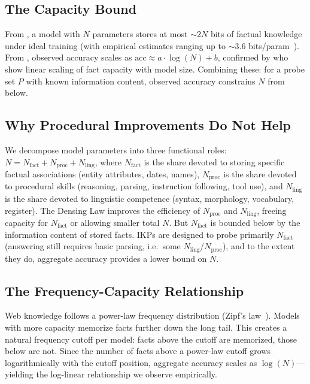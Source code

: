\documentclass[11pt]{article}
\begin{document}
\subsection{The Capacity Bound}

From \citet{allenzhu2025}, a model with $N$ parameters stores at most ${\sim}2N$ bits of factual knowledge under ideal training (with empirical estimates ranging up to ${\sim}3.6$ bits/param~\citep{morris2025memorize}). From \citet{kandpal2023}, observed accuracy scales as $\text{acc} \approx a \cdot \log(N) + b$, confirmed by \citet{lu2024factmemorization} who show linear scaling of fact capacity with model size. Combining these: for a probe set $P$ with known information content, observed accuracy constrains $N$ from below.

\subsection{Why Procedural Improvements Do Not Help}

We decompose model parameters into three functional roles: $N = N_{\text{fact}} + N_{\text{proc}} + N_{\text{ling}}$, where $N_{\text{fact}}$ is the share devoted to storing specific factual associations (entity attributes, dates, names), $N_{\text{proc}}$ is the share devoted to procedural skills (reasoning, parsing, instruction following, tool use), and $N_{\text{ling}}$ is the share devoted to linguistic competence (syntax, morphology, vocabulary, register). The Densing Law improves the efficiency of $N_{\text{proc}}$ and $N_{\text{ling}}$, freeing capacity for $N_{\text{fact}}$ or allowing smaller total $N$. But $N_{\text{fact}}$ is bounded below by the information content of stored facts. IKPs are designed to probe primarily $N_{\text{fact}}$ (answering still requires basic parsing, i.e.\ some $N_{\text{ling}}$/$N_{\text{proc}}$), and to the extent they do, aggregate accuracy provides a lower bound on $N$.

\subsection{The Frequency-Capacity Relationship}

Web knowledge follows a power-law frequency distribution (Zipf's law~\citep{zipf1949human}). Models with more capacity memorize facts further down the long tail. This creates a natural frequency cutoff per model: facts above the cutoff are memorized, those below are not. Since the number of facts above a power-law cutoff grows logarithmically with the cutoff position, aggregate accuracy scales as $\log(N)$---yielding the log-linear relationship we observe empirically.
\end{document}
